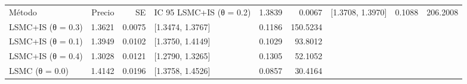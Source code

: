 \begin{tabular}{lrrlrr}
\toprule
Método & Precio & SE & IC 95 %
\midrule
LSMC+IS (θ = 0.2) & 1.3839 & 0.0067 & [1.3708, 1.3970] & 0.1088 & 206.2008 \\
LSMC+IS (θ = 0.3) & 1.3621 & 0.0075 & [1.3474, 1.3767] & 0.1186 & 150.5234 \\
LSMC+IS (θ = 0.1) & 1.3949 & 0.0102 & [1.3750, 1.4149] & 0.1029 & 93.8012 \\
LSMC+IS (θ = 0.4) & 1.3028 & 0.0121 & [1.2790, 1.3265] & 0.1305 & 52.1052 \\
LSMC (θ = 0.0) & 1.4142 & 0.0196 & [1.3758, 1.4526] & 0.0857 & 30.4164 \\
\bottomrule
\end{tabular}
